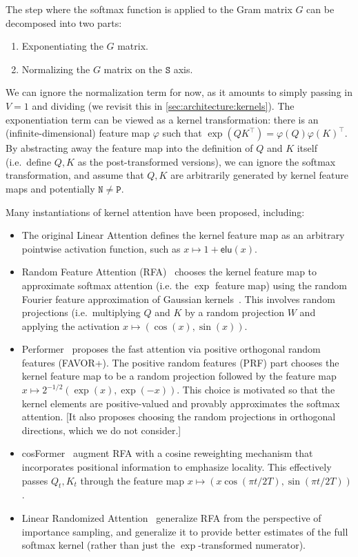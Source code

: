 The step where the softmax function is applied to the Gram matrix $G$ can be decomposed into two parts:

\begin{enumerate}
  \item Exponentiating the $G$ matrix.
  \item Normalizing the $G$ matrix on the $\mathtt{S}$ axis.
\end{enumerate}

We can ignore the normalization term for now, as it amounts to simply passing in $V=1$ and dividing (we revisit this in \ref{sec:architecture:kernels}).
The exponentiation term can be viewed as a kernel transformation: there is an (infinite-dimensional) feature map $\varphi$ such that $\exp(QK^{\top}) = \varphi(Q)\varphi(K)^{\top}$.
By abstracting away the feature map into the definition of $Q$ and $K$ itself (i.e.\ define $Q, K$ as the post-transformed versions), we can ignore the softmax transformation, and assume that $Q, K$ are arbitrarily generated by kernel feature maps and potentially $\mathtt{N} \neq \mathtt{P}$.

Many instantiations of kernel attention have been proposed, including:

\begin{itemize}
  \item The original Linear Attention \citep{katharopoulos2020transformers} defines the kernel feature map as an arbitrary pointwise activation function, such as $x \mapsto 1+\mathsf{elu}(x)$.
  \item Random Feature Attention (RFA)~\citep{peng2021random} chooses the kernel feature map to approximate softmax attention (i.e. the $\exp$ feature map) using the random Fourier feature approximation of Gaussian kernels~\citep{rahimi2007random}. This involves random projections (i.e.\ multiplying $Q$ and $K$ by a random projection $W$ and applying the activation $x \mapsto (\cos(x), \sin(x))$.

  \item Performer~\citep{choromanski2021rethinking} proposes the fast attention via positive orthogonal random features (FAVOR+). The positive random features (PRF) part chooses the kernel feature map to be a random projection followed by the feature map $x \mapsto 2^{-1/2}(\exp(x), \exp(-x))$.
    This choice is motivated so that the kernel elements are positive-valued and provably approximates the softmax attention. [It also proposes choosing the random projections in orthogonal directions, which we do not consider.]
  \item cosFormer~\citep{qin2022cosformer} augment RFA with a cosine reweighting mechanism that incorporates positional information to emphasize locality. This effectively passes $Q_t,K_t$ through the feature map $x \mapsto (x \cos(\pi t / 2T), \sin(\pi t / 2T))$.
  \item Linear Randomized Attention~\citep{zheng2022linear} generalize RFA from the perspective of importance sampling, and generalize it to provide better estimates of the full softmax kernel (rather than just the $\exp$-transformed numerator).
\end{itemize}

